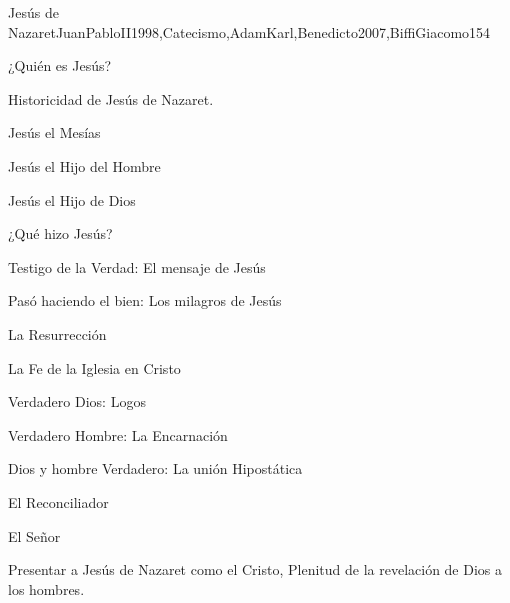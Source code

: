 \begin{syllabus}
\begin{unit}{Jesús de Nazaret}{JuanPabloII1998,Catecismo,AdamKarl,Benedicto2007,BiffiGiacomo}{15}{4}
\begin{topics}
      \item ¿Quién es Jesús?
      \begin{inparaenum}
      \item Historicidad de Jesús de Nazaret.
      \item Jesús el Mesías
      \item Jesús el Hijo del Hombre
      \item Jesús el Hijo de Dios
\end{inparaenum}
      \item ¿Qué hizo Jesús?
      \begin{inparaenum}
      \item Testigo de la Verdad: El mensaje de Jesús
      \item Pasó haciendo el bien: Los milagros de Jesús
      \item La Resurrección
\end{inparaenum}
      \item La Fe de la Iglesia en Cristo
      \begin{inparaenum}
      \item Verdadero Dios: Logos
      \item Verdadero Hombre: La Encarnación
      \item Dios y hombre Verdadero: La unión Hipostática
      \item El Reconciliador
      \item El Señor
	\end{inparaenum}

\end{topics}

\begin{learningoutcomes}
      \item Presentar a Jesús de Nazaret como el Cristo, Plenitud de la revelación de Dios a los hombres.
\end{learningoutcomes}
\end{unit}


\end{syllabus}

